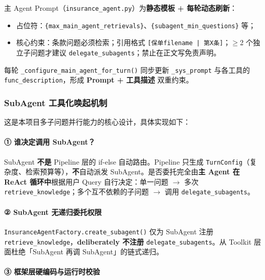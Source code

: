 \documentclass[11pt,a4paper]{ctexart}
\begin{document}
主 Agent Prompt（\texttt{insurance\_agent.py}）为\textbf{静态模板 + 每轮动态刷新}：

\begin{itemize}[nosep]
  \item 占位符：\texttt{\{max\_main\_agent\_retrievals\}}、\texttt{\{subagent\_min\_questions\}} 等；
  \item 核心约束：条款问题必须检索；引用格式 \texttt{[保单filename | 第X条]}；$\geq$2 个独立子问题才建议 \texttt{delegate\_subagents}；禁止在正文写免责声明。
\end{itemize}

每轮 \texttt{\_configure\_main\_agent\_for\_turn()} 同步更新 \texttt{\_sys\_prompt} 与各工具的 \texttt{func\_description}，形成 \textbf{Prompt + 工具描述} 双重约束。

\subsubsection{SubAgent 工具化唤起机制}

这是本项目多子问题并行能力的核心设计，具体实现如下：

\paragraph{① 谁决定调用 SubAgent？}

SubAgent \textbf{不是} Pipeline 层的 if-else 自动路由。Pipeline 只生成 \texttt{TurnConfig}（复杂度、检索预算等），\textbf{不}自动派发 SubAgent。是否委托完全由\textbf{主 Agent 在 ReAct 循环中}根据用户 Query 自行决定：单一问题 $\rightarrow$ 多次 \texttt{retrieve\_knowledge}；多个互不依赖的子问题 $\rightarrow$ 调用 \texttt{delegate\_subagents}。

\paragraph{② SubAgent 无递归委托权限}

\texttt{InsuranceAgentFactory.create\_subagent()} 仅为 SubAgent 注册 \texttt{retrieve\_knowledge}，\textbf{deliberately 不注册} \texttt{delegate\_subagents}。从 Toolkit 层面杜绝「SubAgent 再调 SubAgent」的链式递归。

\paragraph{③ 框架层硬编码与运行时校验}
\end{document}
